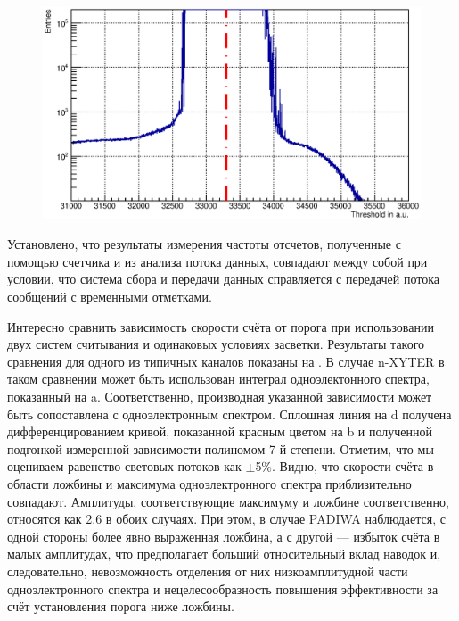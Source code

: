 

\begin{figure}
\includegraphics[width=1.0\textwidth]{pictures/31_cMean12.eps}
\caption{}
\label{fig:TDCscalerScan}
\end{figure}

Установлено, что результаты измерения частоты отсчетов, полученные с помощью счетчика и из анализа потока данных, совпадают между собой при условии, что система сбора и передачи данных справляется с передачей потока сообщений с временными отметками.

Интересно сравнить зависимость скорости счёта от порога при использовании двух систем считывания и одинаковых условиях засветки. Результаты такого сравнения для одного из типичных каналов показаны на . В случае n-XYTER в таком сравнении может быть использован интеграл одноэлектонного спектра, показанный на a. Соответственно, производная указанной зависимости может быть сопоставлена с одноэлектронным спектром. Сплошная линия на d получена дифференцированием кривой, показанной красным цветом на b и полученной подгонкой измеренной зависимости полиномом 7-й степени. Отметим, что мы оцениваем равенство световых потоков как $ \pm $5\%. Видно, что скорости счёта в области ложбины и максимума одноэлектронного спектра приблизительно совпадают. Амплитуды, соответствующие максимуму и ложбине соответственно, относятся как 2.6 в обоих случаях. При этом, в случае PADIWA наблюдается, с одной стороны более явно выраженная ложбина, а с другой --- избыток счёта в малых амплитудах, что предполагает больший относительный вклад наводок и, следовательно, невозможность отделения от них низкоамплитудной части одноэлектронного спектра и нецелесообразность повышения эффективности за счёт установления порога ниже ложбины.

